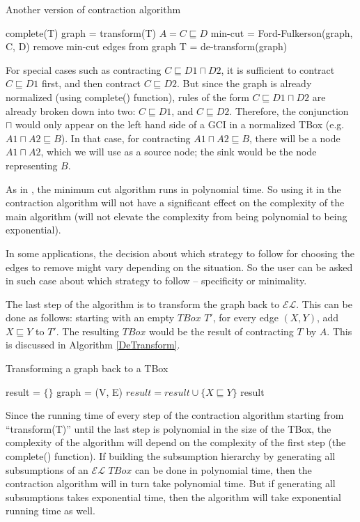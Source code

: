 \begin{algorithm}
\caption{Another version of contraction algorithm}
\label{GraphContract-modified}
\begin{algorithmic}[1]
\State complete(T)
\State graph = transform(T)
\State $A = C \sqsubseteq D$
\State min-cut = Ford-Fulkerson(graph, C, D)
\State remove min-cut edges from graph
\State T = de-transform(graph)
\EndFunction
\end{algorithmic}
\end{algorithm}

For special cases such as contracting $C \sqsubseteq D1 \sqcap D2$, it is sufficient to contract $C \sqsubseteq D1$ first, and then contract $C \sqsubseteq D2$. But since the graph is already normalized (using complete() function), rules of the form $C \sqsubseteq D1 \sqcap D2$ are already broken down into two: $C \sqsubseteq D1$, and $C \sqsubseteq D2$. Therefore, the conjunction $\sqcap$ would only appear on the left hand side of a GCI in a normalized TBox (e.g. $A1 \sqcap A2 \sqsubseteq B$). In that case, for contracting $A1 \sqcap A2 \sqsubseteq B$, there will be a node $A1 \sqcap A2$, which we will use as a source node; the sink would be the node representing $B$. 

As in \cite{alg}, the minimum cut algorithm runs in polynomial time. So using it in the contraction algorithm will not have a significant effect on the complexity of the main algorithm (will not elevate the complexity from being polynomial to being exponential). 

In some applications, the decision about which strategy to follow for choosing the edges to remove might vary depending on the situation. So the user can be asked in such case about which strategy to follow -- specificity or minimality. 

The last step of the algorithm is to transform the graph back to $\mathcal{EL}$. This can be done as follows: starting with an empty $TBox$ $T'$, for every edge $(X, Y)$, add $X \sqsubseteq Y$ to $T'$. The resulting $TBox$ would be the result of contracting $T$ by $A$. This is discussed in Algorithm \ref{DeTransform}.

\begin{algorithm}
\caption{Transforming a graph back to a TBox}
\label{DeTransform}
\begin{algorithmic}[1]
\State result = $\{\}$
\State graph = (V, E)
\State $result = result \cup \{X \sqsubseteq Y\}$
\EndFor
\State \Return result
\EndFunction
\end{algorithmic}
\end{algorithm}

Since the running time of every step of the contraction algorithm starting from ``transform(T)'' until the last step is polynomial in the size of the TBox, the complexity of the algorithm will depend on the complexity of the first step (the complete() function). If building the subsumption hierarchy by generating all subsumptions of an $\mathcal{EL}$ $TBox$ can be done in polynomial time, then the contraction algorithm will in turn take polynomial time. But if generating all subsumptions takes exponential time, then the algorithm will take exponential running time as well.